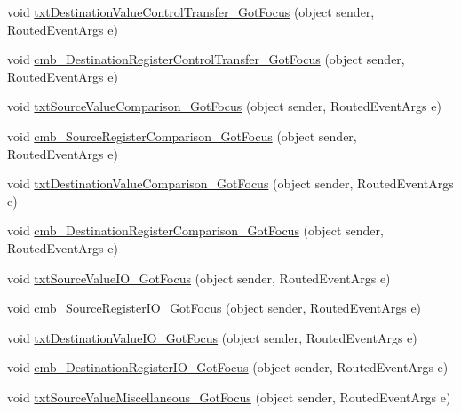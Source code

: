\begin{DoxyCompactItemize}
\item 
void \hyperlink{class_c_p_u___o_s___simulator_1_1_instructions_window_ab9695cfa485c6cd4f6d941c93105187b}{txt\+Destination\+Value\+Control\+Transfer\+\_\+\+Got\+Focus} (object sender, Routed\+Event\+Args e)
\item 
void \hyperlink{class_c_p_u___o_s___simulator_1_1_instructions_window_a5f5a0d30cab0406f864a56163f7996ba}{cmb\+\_\+\+Destination\+Register\+Control\+Transfer\+\_\+\+Got\+Focus} (object sender, Routed\+Event\+Args e)
\item 
void \hyperlink{class_c_p_u___o_s___simulator_1_1_instructions_window_a7fc4519d09df6fde91777a5a56101b92}{txt\+Source\+Value\+Comparison\+\_\+\+Got\+Focus} (object sender, Routed\+Event\+Args e)
\item 
void \hyperlink{class_c_p_u___o_s___simulator_1_1_instructions_window_a832c901ee54eaab86d0a10cac789e114}{cmb\+\_\+\+Source\+Register\+Comparison\+\_\+\+Got\+Focus} (object sender, Routed\+Event\+Args e)
\item 
void \hyperlink{class_c_p_u___o_s___simulator_1_1_instructions_window_a2f346b8f78940a1626ab5419af3973ef}{txt\+Destination\+Value\+Comparison\+\_\+\+Got\+Focus} (object sender, Routed\+Event\+Args e)
\item 
void \hyperlink{class_c_p_u___o_s___simulator_1_1_instructions_window_a867a9b46a598bfb0b067da68707961ca}{cmb\+\_\+\+Destination\+Register\+Comparison\+\_\+\+Got\+Focus} (object sender, Routed\+Event\+Args e)
\item 
void \hyperlink{class_c_p_u___o_s___simulator_1_1_instructions_window_a83fbca00e890edc28dd3d58c350360eb}{txt\+Source\+Value\+I\+O\+\_\+\+Got\+Focus} (object sender, Routed\+Event\+Args e)
\item 
void \hyperlink{class_c_p_u___o_s___simulator_1_1_instructions_window_a7046f3fb03ffcc336bcc0af4db5857de}{cmb\+\_\+\+Source\+Register\+I\+O\+\_\+\+Got\+Focus} (object sender, Routed\+Event\+Args e)
\item 
void \hyperlink{class_c_p_u___o_s___simulator_1_1_instructions_window_a0d69d4710419b9efea12396940b60e89}{txt\+Destination\+Value\+I\+O\+\_\+\+Got\+Focus} (object sender, Routed\+Event\+Args e)
\item 
void \hyperlink{class_c_p_u___o_s___simulator_1_1_instructions_window_a565cca857d005347574918cdc5cab5b9}{cmb\+\_\+\+Destination\+Register\+I\+O\+\_\+\+Got\+Focus} (object sender, Routed\+Event\+Args e)
\item 
void \hyperlink{class_c_p_u___o_s___simulator_1_1_instructions_window_ae5a577d3fa0f6abeb8239de87a4c4a48}{txt\+Source\+Value\+Miscellaneous\+\_\+\+Got\+Focus} (object sender, Routed\+Event\+Args e)

\end{DoxyCompactItemize}
